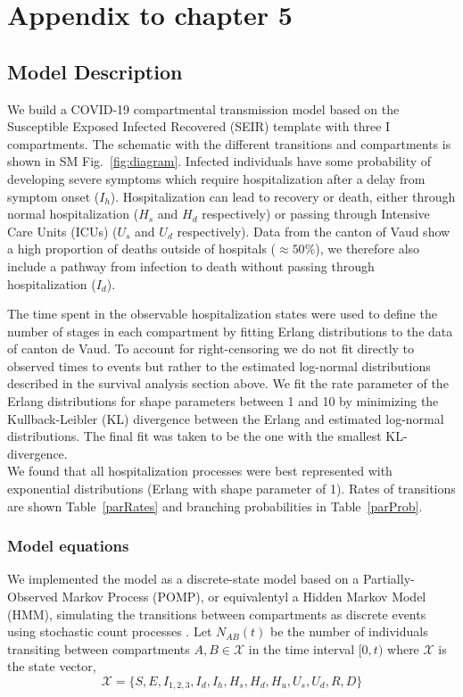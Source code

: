 \chapter{Appendix to chapter 5}

\section{Model Description}
We build a COVID-19 compartmental transmission model based on the Susceptible Exposed Infected Recovered (SEIR) template with three I compartments. The schematic with the different transitions and compartments is shown in SM Fig.~\ref{fig:diagram}. Infected individuals have some probability of developing severe symptoms which require hospitalization after a delay from symptom onset ($I_h$). Hospitalization can lead to recovery or death, either through normal hospitalization ($H_{s}$ and $H_d$ respectively) or passing through Intensive Care Units (ICUs) ($U_{s}$ and $U_d$ respectively). Data from the canton of Vaud show a high proportion of deaths outside of hospitals ($\approx 50\%$), we therefore also include a pathway from infection to death without passing through hospitalization ($I_d$). 


The time spent in the observable hospitalization states were used to define the number of stages in each compartment by fitting Erlang distributions to the data of canton de Vaud. To account for right-censoring we do not fit directly to observed times to events but rather to the estimated log-normal distributions described in the survival analysis section above. We fit the rate parameter of the Erlang distributions for shape parameters between 1 and 10 by minimizing the Kullback-Leibler (KL) divergence between the Erlang and estimated log-normal distributions. The final fit was taken to be the one with the smallest KL-divergence. \\


We found that all hospitalization processes were best represented with exponential distributions (Erlang with shape parameter of 1). Rates of transitions are shown Table~\ref{parRates} and branching probabilities in Table~\ref{parProb}.

\subsection{Model equations}\label{sec:stoch}
We implemented the model as a discrete-state model based on a Partially-Observed Markov Process (POMP), or equivalentyl a Hidden Markov Model (HMM), simulating the transitions between compartments as discrete events using stochastic count processes \cite{king_inapparent_2008, breto_time_2009}. Let \(N_{AB}(t)\) be the number of individuals transiting between compartments \(A,B\in \mathcal{X}\) in the time interval \([0,t)\)  where $\mathcal{X}$ is the state vector,
$$\mathcal{X} = \{S, E, I_{1,2,3} , I_d, I_h, H_{s}, H_{d}, H_{u}, U_{s}, U_{d}, R, D\}$$

